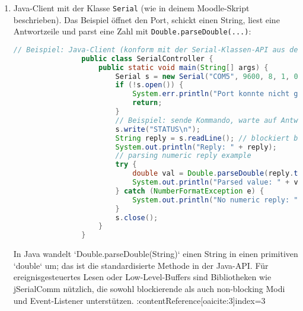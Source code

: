 \documentclass[11pt,a4paper,oneside]{article}
\newcounter{boxseq}
\newcommand{\nextboxcolors}{%
	\stepcounter{boxseq}%
	\ifcase\value{boxseq}%
	\def\CurrentAccentName{Step0}%
	\or\def\CurrentAccentName{Step1}%
	\or\def\CurrentAccentName{Step2}%
	\or\def\CurrentAccentName{Step3}%
	\or\def\CurrentAccentName{Step4}%
	\or\def\CurrentAccentName{Step5}%
	\or\def\CurrentAccentName{Step6}%
	\else\def\CurrentAccentName{Step7}%
	\fi
	\edef\CurrentAccentDarkName{\CurrentAccentName!70!black}%
	\edef\CurrentAccentFrameName{\CurrentAccentName!50!black}%
}
\newcounter{beispiel}[section]
\newcounter{aufgabe}[section]
\renewcommand{\theaufgabe}{\thesection.\arabic{aufgabe}}
\newenvironment{aufgabe}[1]{%
	\refstepcounter{aufgabe}%
	\nextboxcolors%
	\begin{tcolorbox}[termbase,
		colframe=\CurrentAccentFrameName,
		boxed title style={interior style={left color=\CurrentAccentName, right color=\CurrentAccentDarkName}},
		title={Aufgabe~\theaufgabe: #1}]%
	}{\end{tcolorbox}}
\begin{document}
\begin{aufgabe}{Steuerung eines Mikroprozessors mit der seriellen Schnittstelle}
\begin{enumerate}
\begin{lstlisting}[language=C, caption={Arduino: Serial command handler}]
				void loop() {
					if (Serial.available() > 0) { // number of bytes available
						String cmd = Serial.readStringUntil('\n'); // read until newline
						cmd.trim();
						if (cmd == "LED ON") {
							digitalWrite(LED_PIN, HIGH);
							Serial.println("OK");
						} else if (cmd == "LED OFF") {
							digitalWrite(LED_PIN, LOW);
							Serial.println("OK");
						} else if (cmd == "STATUS") {
							Serial.println(digitalRead(LED_PIN) ? "ON" : "OFF");
						} else {
							Serial.println("ERR");
						}
					}
				}
			\end{lstlisting}
			
			Die Arduino-API stellt `Serial.available()` und `Serial.read()` / `readStringUntil()` bereit; `available()` gibt die Anzahl bereits empfangener Bytes an, `read()` liefert das nächste Byte oder -1, wenn nichts da ist — das ist der übliche Pattern für nicht-blockierende Abfragen auf Arduino. :contentReference[oaicite:2]{index=2}
			
			\item Java-Client mit der Klasse \texttt{Serial} (wie in deinem Moodle-Skript beschrieben). Das Beispiel öffnet den Port, schickt einen String, liest eine Antwortzeile und parst eine Zahl mit \texttt{Double.parseDouble(...)}:
			\begin{lstlisting}[language=Java, caption={Java: Steuerprogramm (Nutzungsbeispiel der in der Aufgabenstellung beschriebenen Serial-Klasse)}]
				// Beispiel: Java-Client (konform mit der Serial-Klassen-API aus der Aufgabenstellung)
				public class SerialController {
					public static void main(String[] args) {
						Serial s = new Serial("COM5", 9600, 8, 1, 0); // parity 0 = none, falls so erwartet
						if (!s.open()) {
							System.err.println("Port konnte nicht geöffnet werden");
							return;
						}
						// Beispiel: sende Kommando, warte auf Antwort als Zeile
						s.write("STATUS\n");
						String reply = s.readLine(); // blockiert bis Zeile komplett
						System.out.println("Reply: " + reply);
						// parsing numeric reply example
						try {
							double val = Double.parseDouble(reply.trim());
							System.out.println("Parsed value: " + val);
						} catch (NumberFormatException e) {
							System.out.println("No numeric reply: " + reply);
						}
						s.close();
					}
				}
			\end{lstlisting}
			
			In Java wandelt `Double.parseDouble(String)` einen String in einen primitiven `double` um; das ist die standardisierte Methode in der Java-API. Für ereignisgesteuertes Lesen oder Low-Level-Buffers sind Bibliotheken wie jSerialComm nützlich, die sowohl blockierende als auch non-blocking Modi und Event-Listener unterstützen. :contentReference[oaicite:3]{index=3}
			

\end{enumerate}
\end{aufgabe}
\end{document}
